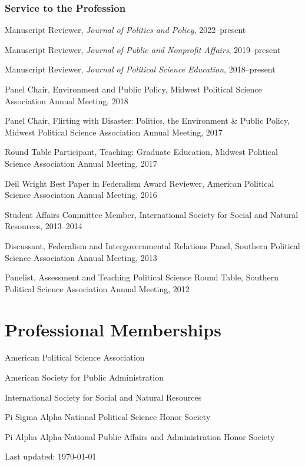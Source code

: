 \documentclass[12pt,letterpaper]{article}
\renewenvironment{itemize}{
  \begin{list}{}{
    \setlength{\leftmargin}{1.5em}
    \setlength{\itemsep}{0.25em}
    \setlength{\parskip}{0pt}
    \setlength{\parsep}{0.25em}
  }
}{
  \end{list}
}
\begin{document}
\subsubsection*{Service to the Profession}
\begin{itemize}\leftmargin=2pt\itemindent=-15pt
  \item Manuscript Reviewer, \emph{Journal of Politics and Policy}, 2022--present
  \item Manuscript Reviewer, \emph{Journal of Public and Nonprofit Affairs}, 2019--present
  \item Manuscript Reviewer, \emph{Journal of Political Science Education}, 2018--present
  \item Panel Chair, Environment and Public Policy, Midwest Political Science Association Annual Meeting, 2018
  \item Panel Chair, Flirting with Disaster: Politics, the Environment \& Public Policy, Midwest Political Science Association Annual Meeting, 2017
  \item Round Table Participant, Teaching: Graduate Education, Midwest Political Science Association Annual Meeting, 2017
  \item Deil Wright Best Paper in Federalism Award Reviewer, American Political Science Association Annual Meeting, 2016
  \item Student Affairs Committee Member, International Society for Social and Natural Resources, 2013--2014
  \item Discussant, Federalism and Intergovernmental Relations Panel, Southern Political Science Association Annual Meeting, 2013
  \item Panelist, Assessment and Teaching Political Science Round Table, Southern Political Science Association Annual Meeting, 2012
\end{itemize}


\section*{Professional Memberships}
\begin{itemize}\leftmargin=2pt\itemindent=-15pt
  \item American Political Science Association
  \item American Society for Public Administration
  \item International Society for Social and Natural Resources
  \item Pi Sigma Alpha National Political Science Honor Society
  \item Pi Alpha Alpha National Public Affairs and Administration Honor Society
\end{itemize}

	
\vspace{.5in}
\begin{center}
  \begin{small}
    Last updated: \today
      \end{small}
\end{center}
\end{document}
